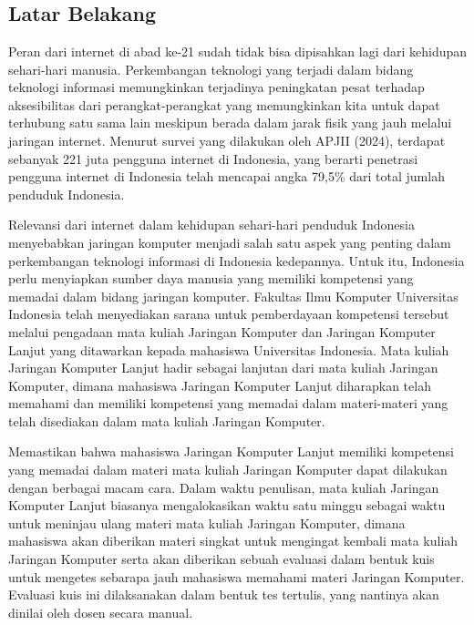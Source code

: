 \chapter{\babSatu}
\label{bab:1}


\section{Latar Belakang}
\label{sec:latarBelakang}
Peran dari internet di abad ke-21 sudah tidak bisa dipisahkan lagi dari kehidupan sehari-hari manusia. Perkembangan teknologi yang terjadi
dalam bidang teknologi informasi memungkinkan terjadinya peningkatan pesat terhadap aksesibilitas dari perangkat-perangkat yang memungkinkan kita untuk
dapat terhubung satu sama lain meskipun berada dalam jarak fisik yang jauh melalui jaringan internet. Menurut survei yang dilakukan oleh APJII (2024),
terdapat sebanyak 221 juta pengguna internet di Indonesia, yang berarti penetrasi pengguna internet di Indonesia telah mencapai angka 79,5\% dari total
jumlah penduduk Indonesia. 
\par

Relevansi dari internet dalam kehidupan sehari-hari penduduk Indonesia menyebabkan jaringan komputer menjadi salah satu aspek yang penting dalam perkembangan
teknologi informasi di Indonesia kedepannya. Untuk itu, Indonesia perlu menyiapkan sumber daya manusia yang memiliki kompetensi yang memadai dalam bidang
jaringan komputer. Fakultas Ilmu Komputer Universitas Indonesia telah menyediakan sarana untuk pemberdayaan kompetensi tersebut melalui pengadaan
mata kuliah Jaringan Komputer dan Jaringan Komputer Lanjut yang ditawarkan kepada mahasiswa Universitas Indonesia. Mata kuliah Jaringan Komputer Lanjut
hadir sebagai lanjutan dari mata kuliah Jaringan Komputer, dimana mahasiswa Jaringan Komputer Lanjut diharapkan telah memahami dan memiliki kompetensi
yang memadai dalam materi-materi yang telah disediakan dalam mata kuliah Jaringan Komputer.
\par

Memastikan bahwa mahasiswa Jaringan Komputer Lanjut memiliki kompetensi yang memadai dalam materi mata kuliah Jaringan Komputer dapat dilakukan dengan berbagai macam cara.
Dalam waktu penulisan, mata kuliah Jaringan Komputer Lanjut biasanya mengalokasikan waktu satu minggu sebagai waktu untuk meninjau ulang materi mata kuliah
Jaringan Komputer, dimana mahasiswa akan diberikan materi singkat untuk mengingat kembali mata kuliah Jaringan Komputer serta akan diberikan sebuah evaluasi
dalam bentuk kuis untuk mengetes sebarapa jauh mahasiswa memahami materi Jaringan Komputer. Evaluasi kuis ini dilaksanakan dalam bentuk tes tertulis, yang nantinya
akan dinilai oleh dosen secara manual. 
\par

